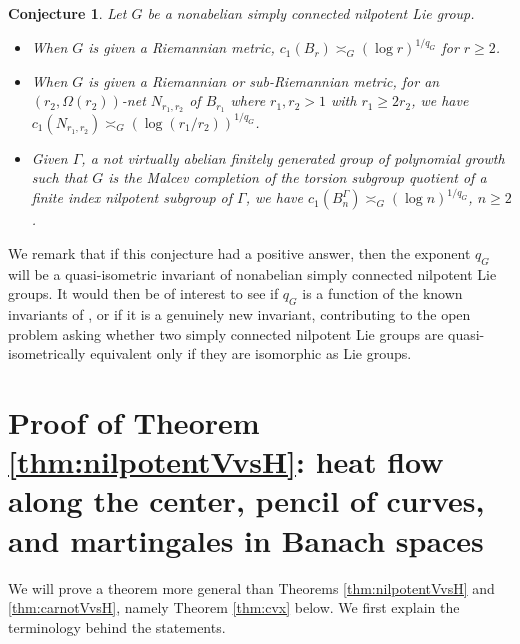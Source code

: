\documentclass[11pt,reqno]{amsart}
\newtheorem{conjecture}[theorem]{Conjecture}
\newcommand{\1}{\mathbf 1}
\begin{document}
\begin{conjecture}\label{ques:polyL1}
Let $G$ be a nonabelian simply connected nilpotent Lie group.
\begin{itemize}
\item When $G$ is given a Riemannian metric, $c_1\left(B_r\right)\asymp_G\left(\log r\right)^{1/q_G}$ for $r\ge 2$.
\item When $G$ is given a Riemannian or sub-Riemannian metric, for an $\left(r_2,\Omega\left(r_2\right)\right)$-net $N_{r_1,r_2}$ of $B_{r_1}$ where $r_1,r_2>1$ with $r_1\ge 2r_2$, we have $c_1\left(N_{r_1,r_2}\right)\asymp_G \left(\log \left(r_1/r_2\right)\right)^{1/q_G}$.
\item Given $\Gamma$, a not virtually abelian finitely generated group of polynomial growth such that $G$ is the Malcev completion of the torsion subgroup quotient of a finite index nilpotent subgroup of $\Gamma$, we have $c_1\left(B^\Gamma_n\right)\asymp_G \left(\log n\right)^{1/q_G}$, $n\ge 2$.
\end{itemize}
\end{conjecture}
We remark that if this conjecture had a positive answer, then the exponent $q_G$ will be a quasi-isometric invariant of nonabelian simply connected nilpotent Lie groups. It would then be of interest to see if $q_G$ is a function of the known invariants of \cite{shalom2004harmonic,sauer2006homological,cornulier2012quasi}, or if it is a genuinely new invariant, contributing to the open problem \cite[Conjecture 19.114]{cornulier2012quasi} asking whether two simply connected nilpotent Lie groups are quasi-isometrically equivalent only if they are isomorphic as Lie groups.








\section{Proof of Theorem \ref{thm:nilpotentVvsH}: heat flow along the center, pencil of curves, and martingales in Banach spaces}\label{sec:cvx}
We will prove a theorem more general than Theorems \ref{thm:nilpotentVvsH} and \ref{thm:carnotVvsH}, namely Theorem \ref{thm:cvx} below. We first explain the terminology behind the statements.
\end{document}
